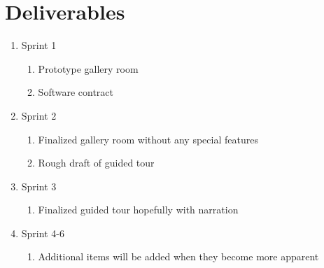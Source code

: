 \documentclass[11pt]{article}
\begin{document}
\section{Deliverables}
\begin{enumerate}
\item Sprint 1
	\begin{enumerate}
	\item Prototype gallery room
	\item Software contract
	\end{enumerate}

\item Sprint 2
	\begin{enumerate}
	\item Finalized gallery room without any special features
	\item Rough draft of guided tour
	\end{enumerate}
	
\item Sprint 3
	\begin{enumerate}
	\item Finalized guided tour hopefully with narration
	\end{enumerate}

\item Sprint 4-6
	\begin{enumerate}
	\item Additional items will be added when they become more apparent
	\end{enumerate}
\end{enumerate}
\end{document}
